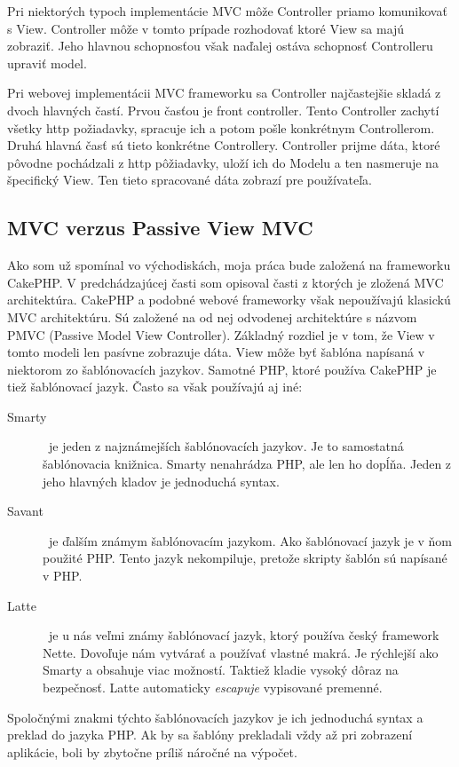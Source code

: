\documentclass[12pt,onesided]{book}
\begin{document}
Pri niektorých typoch implementácie MVC môže Controller priamo komunikovať s View. Controller môže v tomto prípade rozhodovať ktoré View sa majú zobraziť. Jeho hlavnou schopnosťou však naďalej ostáva schopnosť Controlleru upraviť model.

Pri webovej implementácii MVC frameworku sa Controller najčastejšie skladá z dvoch hlavných častí. Prvou časťou je front controller. Tento Controller zachytí všetky http požiadavky, spracuje ich a potom pošle konkrétnym Controllerom. Druhá hlavná časť sú tieto konkrétne Controllery. Controller prijme dáta, ktoré pôvodne pochádzali z http pôžiadavky, uloží ich do Modelu a ten nasmeruje na špecifický View. Ten tieto spracované dáta zobrazí pre používateľa.

\subsection{MVC verzus Passive View MVC}
Ako som už spomínal vo východiskách, moja práca bude založená na frameworku CakePHP. V predchádzajúcej časti som opisoval časti z ktorých je zložená MVC architektúra. CakePHP a podobné webové frameworky však nepoužívajú klasickú MVC architektúru. Sú založené na od nej odvodenej architektúre s názvom PMVC (Passive Model View Controller). Základný rozdiel je v tom, že View v tomto modeli len pasívne zobrazuje dáta. View môže byť šablóna napísaná v niektorom zo šablónovacích jazykov. Samotné PHP, ktoré používa CakePHP je tiež šablónovací jazyk. Často sa však používajú aj iné: 


\begin{description}
\item [Smarty] \cite{Smarty}\  je jeden z najznámejších šablónovacích jazykov. Je to samostatná šablónovacia knižnica. Smarty nenahrádza PHP, ale len ho dopĺňa. Jeden z jeho hlavných kladov je jednoduchá syntax.
\item [Savant] \cite{Savant}\  je ďalším známym šablónovacím jazykom. Ako šablónovací jazyk je v ňom použité PHP. Tento jazyk nekompiluje, pretože skripty šablón sú napísané v PHP.
\item [Latte] \cite{Latte}\  je u nás veľmi známy šablónovací jazyk, ktorý používa český framework Nette. Dovoľuje nám vytvárať a používať vlastné makrá. Je rýchlejší ako Smarty a obsahuje viac možností. Taktiež kladie vysoký dôraz na bezpečnosť. Latte automaticky \emph{escapuje} vypisované premenné.
\end{description}

Spoločnými znakmi týchto šablónovacích jazykov je ich jednoduchá syntax a preklad do jazyka PHP. Ak by sa šablóny prekladali vždy až pri zobrazení aplikácie, boli by zbytočne príliš náročné na výpočet.
\newline
\end{document}
